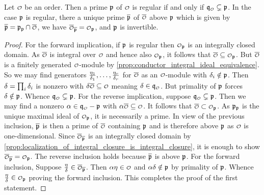     \begin{proposition}\label{prop:regular_primes_relative_to_conductor}
      Let \(\smc{O}\) be an order. Then a prime \(\mathfrak{p}\) of \(\smc{O}\) is regular if and only if \(\mf{q}_{\smc{O}} \subsetneq \mf{p}\). In the case \(\mathfrak{p}\) is regular, there a unique prime \(\overline{\mathfrak{p}}\) of \(\conj{\smc{O}}\) above \(\mathfrak{p}\) which is given by \(\conj{\mf{p}} = \mf{p}_{\mf{p}} \cap \conj{\smc{O}}\), we have \(\conj{\smc{O}}_{\conj{\mf{p}}} = \smc{O}_{\mf{p}}\), and \(\mathfrak{p}\) is invertible. 
    \end{proposition}
    \begin{proof}
      For the forward implication, if \(\mathfrak{p}\) is regular then \(\smc{O}_{\mf{p}}\) is an integrally closed domain. As \(\conj{\smc{O}}\) is integral over \(\smc{O}\) and hence also \(\smc{O}_{\mf{p}}\), it follows that \(\conj{\smc{O}} \subseteq \smc{O}_{\mf{p}}\). But \(\conj{\smc{O}}\) is a finitely generated \(\smc{O}\)-module by \cref{prop:conductor_integral_ideal_equivalence}. So we may find generators \(\frac{\eta_{1}}{\delta_{1}},\ldots,\frac{\eta_{r}}{\delta_{r}}\) for \(\conj{\smc{O}}\) as an \(\smc{O}\)-module with \(\delta_{i} \notin \mathfrak{p}\). Then \(\delta = \prod_{i}\delta_{i}\) is nonzero with \(\d\conj{\smc{O}} \subseteq \smc{O}\) meaning \(\d \in \mf{q}_{\smc{O}}\). But primality of \(\mathfrak{p}\) forces \(\delta \notin \mathfrak{p}\). Whence \(\mf{q}_{\smc{O}} \subsetneq \mf{p}\). For the reverse implication, suppose \(\mf{q}_{\smc{O}} \subsetneq \mf{p}\). Then we may find a nonzero \(\a \in \mf{q}_{\smc{O}}-\mf{p}\) with \(\a\conj{\smc{O}} \subseteq \smc{O}\). It follows that \(\conj{\smc{O}} \subset \smc{O}_{\mf{p}}\). As \(\mathfrak{p}_{\mathfrak{p}}\) is the unique maximal ideal of \(\smc{O}_{\mf{p}}\), it is necessarily a prime. In view of the previous inclusion, \(\overline{\mathfrak{p}}\) is then a prime of \(\conj{\smc{O}}\) containing \(\mathfrak{p}\) and is therefore above \(\mathfrak{p}\) as \(\smc{O}\) is one-dimensional. Since \(\conj{\smc{O}}_{\conj{\mf{p}}}\) is an integrally closed domain by \cref{prop:localization_of_integral_closure_is_integral_closure}, it is enough to show \(\conj{\smc{O}}_{\conj{\mf{p}}} = \smc{O}_{\mf{p}}\). The reverse inclusion holds because \(\overline{\mathfrak{p}}\) is above \(\mathfrak{p}\). For the forward inclusion, Suppose \(\frac{\eta}{\d} \in \conj{\smc{O}}_{\conj{\mf{p}}}\). Then \(\a\eta \in \smc{O}\) and \(\alpha\delta \notin \mathfrak{p}\) by primality of \(\mathfrak{p}\). Whence \(\frac{\eta}{\d} \in \smc{O}_{\mf{p}}\) proving the forward inclusion. This completes the proof of the first statement.


\end{proof}
